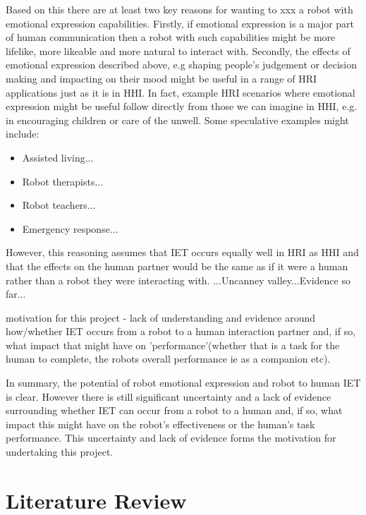 \documentclass[]{article}
\begin{document}
Based on this there are at least two key reasons for wanting to xxx a robot with emotional expression capabilities. Firstly, if emotional expression is a major part of human communication then a robot with such capabilities might be more lifelike, more likeable and more natural to interact with. Secondly, the effects of emotional expression described above, e.g shaping people's judgement or decision making and impacting on their mood might be useful in a range of HRI applications just as it is in HHI. In fact, example HRI scenarios where emotional expression might be useful follow directly from those we can imagine in HHI, e.g. in encouraging children or care of the unwell. Some speculative examples might include:
\begin{itemize}
\item Assisted living...
\item Robot therapists...
\item Robot teachers...
\item Emergency response...
\end{itemize}

However, this reasoning assumes that IET occurs equally well in HRI as HHI and that the effects on the human partner would be the same as if it were a human rather than a robot they were interacting with. ...Uncanney valley...Evidence so far... 

motivation for this project - lack of understanding and evidence around how/whether IET occurs from a robot to a human interaction partner and, if so, what impact that might have on 'performance'(whether that is a task for the human to complete, the robots overall performance ie as a companion etc). 

In summary, the potential of robot emotional expression and robot to human IET is clear. However there is still significant uncertainty and a lack of evidence surrounding whether IET can occur from a robot to a human and, if so, what impact this might have on the robot's effectiveness or the human's task performance. This uncertainty and lack of evidence forms the motivation for undertaking this project. 

\section{Literature Review}
\end{document}
